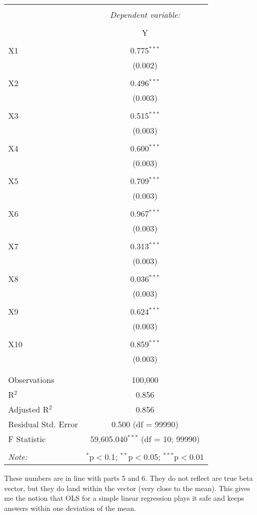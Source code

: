\documentclass{article}
\begin{document}
\begin{table}[!htbp] \centering 
  \caption{} 
  \label{} 
\begin{tabular}{@{\extracolsep{5pt}}lc} 
\\[-1.8ex]\hline 
\hline \\[-1.8ex] 
 & \multicolumn{1}{c}{\textit{Dependent variable:}} \\ 
\cline{2-2} 
\\[-1.8ex] & Y \\ 
\hline \\[-1.8ex] 
 X1 & 0.775$^{***}$ \\ 
  & (0.002) \\ 
  & \\ 
 X2 & 0.496$^{***}$ \\ 
  & (0.003) \\ 
  & \\ 
 X3 & 0.515$^{***}$ \\ 
  & (0.003) \\ 
  & \\ 
 X4 & 0.600$^{***}$ \\ 
  & (0.003) \\ 
  & \\ 
 X5 & 0.709$^{***}$ \\ 
  & (0.003) \\ 
  & \\ 
 X6 & 0.967$^{***}$ \\ 
  & (0.003) \\ 
  & \\ 
 X7 & 0.313$^{***}$ \\ 
  & (0.003) \\ 
  & \\ 
 X8 & 0.036$^{***}$ \\ 
  & (0.003) \\ 
  & \\ 
 X9 & 0.624$^{***}$ \\ 
  & (0.003) \\ 
  & \\ 
 X10 & 0.859$^{***}$ \\ 
  & (0.003) \\ 
  & \\ 
\hline \\[-1.8ex] 
Observations & 100,000 \\ 
R$^{2}$ & 0.856 \\ 
Adjusted R$^{2}$ & 0.856 \\ 
Residual Std. Error & 0.500 (df = 99990) \\ 
F Statistic & 59,605.040$^{***}$ (df = 10; 99990) \\ 
\hline 
\hline \\[-1.8ex] 
\textit{Note:}  & \multicolumn{1}{r}{$^{*}$p$<$0.1; $^{**}$p$<$0.05; $^{***}$p$<$0.01} \\ 
\end{tabular} 
\end{table} 

These numbers are in line with parts 5 and 6. They do not reflect are true beta vector, but they do land within the vector (very close to the mean). This gives me the notion that OLS for a simple linear regression plays it safe and keeps answers within one deviation of the mean.
\end{document}
